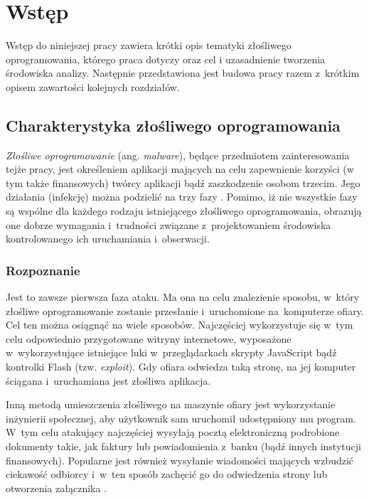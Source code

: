 \documentclass[a4paper,12pt,oneside]{article}
\begin{document}
	\newpage	
	\thispagestyle{empty}
	\cleardoublepage 
		
	\newpage
	\tableofcontents
	\newpage
	
	\pagestyle{plain}
	
	\section{Wstęp}
	Wstęp do niniejszej pracy zawiera krótki opis tematyki złośliwego oprogramowania, którego praca dotyczy oraz cel i uzasadnienie tworzenia środowiska analizy. Następnie przedstawiona jest budowa pracy razem z~krótkim opisem zawartości kolejnych rozdziałów.
	
	\subsection{Charakterystyka złośliwego oprogramowania}	
	\textit{Złośliwe oprogramowanie} (ang. \textit{malware}), będące przedmiotem zainteresowania tejże pracy, jest określeniem aplikacji mających na celu zapewnienie korzyści (w tym także finansowych) twórcy aplikacji bądź zaszkodzenie osobom trzecim. Jego działania (infekcję) można podzielić na trzy fazy \cite{qnap-malware, www-malware-phases}. Pomimo, iż nie wszystkie fazy są wspólne dla każdego rodzaju istniejącego złośliwego oprogramowania, obrazują one dobrze wymagania i~trudności związane z~projektowaniem środowiska kontrolowanego ich uruchamiania i~obserwacji.
	
	\subsubsection{Rozpoznanie}
	
	Jest to zawsze pierwsza faza ataku. Ma ona na celu znalezienie sposobu, w~który złośliwe oprogramowanie zostanie przesłanie i~uruchomione na~komputerze ofiary. Cel ten można osiągnąć na wiele sposobów. Najczęściej wykorzystuje się w~tym celu odpowiednio przygotowane witryny internetowe, wyposażone w~wykorzystujące istniejące luki w~przeglądarkach skrypty JavaScript bądź kontrolki Flash (tzw. \textit{exploit}). Gdy ofiara odwiedza taką stronę, na jej komputer ściągana i~uruchamiana jest złośliwa aplikacja. 
	
	Inną metodą umieszczenia złośliwego na maszynie ofiary jest wykorzystanie inżynierii społecznej, aby użytkownik sam uruchomił udostępniony mu program. W~tym celu atakujący najczęściej wysyłają pocztą elektroniczną podrobione dokumenty takie, jak faktury \cite{www-niebezp-kaspersky} lub powiadomienia z~banku (bądź innych instytucji finansowych). Popularne jest również wysyłanie wiadomości mających wzbudzić ciekawość odbiorcy i~w~ten sposób zachęcić go do odwiedzenia strony lub otworzenia załącznika \cite{www-niebezp-fb}.
	
\end{document}
